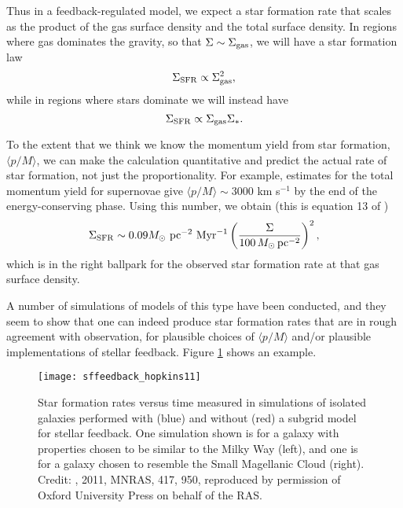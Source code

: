 Thus in a feedback-regulated model, we expect a star formation rate that scales as the product of the gas surface density and the total surface density. In regions where gas dominates the gravity, so that $\Sigma \sim \Sigma_{\rm gas}$, we will have a star formation law
\begin{equation}
\Sigma_{\rm SFR} \propto \Sigma_{\rm gas}^2,
\end{equation}
while in regions where stars dominate we will instead have
\begin{equation}
\Sigma_{\rm SFR} \propto \Sigma_{\rm gas} \Sigma_*.
\end{equation}

To the extent that we think we know the momentum yield from star formation, $\langle p/M\rangle$, we can make the calculation quantitative and predict the actual rate of star formation, not just the proportionality. For example, estimates for the total momentum yield for supernovae give $\langle p/M\rangle \sim 3000$ km s$^{-1}$ by the end of the energy-conserving phase. Using this number, we obtain (this is equation 13 of \citealt{ostriker11a})
\begin{equation}
\Sigma_{\rm SFR} \sim 0.09 M_\odot\mbox{ pc}^{-2}\mbox{ Myr}^{-1} \left(\frac{\Sigma}{100\,M_\odot\,\mathrm{pc}^{-2}}\right)^2,
\end{equation}
which is in the right ballpark for the observed star formation rate at that gas surface density.

A number of simulations of models of this type have been conducted, and they seem to show that one can indeed produce star formation rates that are in rough agreement with observation, for plausible choices of $\langle p/M\rangle$ and/or plausible implementations of stellar feedback. Figure \ref{fig:sffeedback_hopkins11} shows an example.

\begin{figure}
\texttt{[image: sffeedback\_hopkins11]}
\caption[Star formation rates in galaxy simulations with and without stellar feedback]{
\label{fig:sffeedback_hopkins11}
Star formation rates versus time measured in simulations of isolated galaxies performed with (blue) and without (red) a subgrid model for stellar feedback. One simulation shown is for a galaxy with properties chosen to be similar to the Milky Way (left), and one is for a galaxy chosen to resemble the Small Magellanic Cloud (right). Credit: \citeauthor{hopkins11a}, 2011, MNRAS, 417, 950, reproduced by
permission of Oxford University Press on behalf of the RAS.
}
\end{figure}


